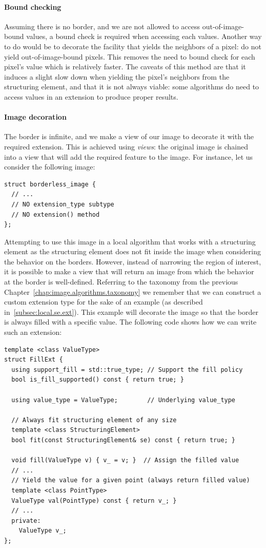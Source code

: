 \paragraph{Bound checking}
Assuming there is no border, and we are not allowed to access out-of-image-bound values, a bound check is required when
accessing each values. Another way to do would be to decorate the facility that yields the neighbors of a pixel: do not
yield out-of-image-bound pixels. This removes the need to bound check for each pixel's value which is relatively
faster. The caveats of this method are that it induces a slight slow down when yielding the pixel's neighbors from the
structuring element, and that it is not always viable: some algorithms do need to access values in an extension to
produce proper results.

\paragraph{Image decoration}
The border is infinite, and we make a view of our image to decorate it with the required extension. This is achieved
using \emph{views}: the original image is chained into a view that will add the required feature to the image. For
instance, let us consider the following image:
\begin{verbatim}
struct borderless_image {
  // ...
  // NO extension_type subtype
  // NO extension() method
};
\end{verbatim}

Attempting to use this image in a local algorithm that works with a structuring element as the structuring element does
not fit inside the image when considering the behavior on the borders. However, instead of narrowing the region of
interest, it is possible to make a view that will return an image from which the behavior at the border is well-defined.
Referring to the taxonomy from the previous Chapter~\ref{chap:image.algorithms.taxonomy} we remember that we can
construct a custom extension type for the sake of an example (as described in~\cref{subsec:local.se.ext}). This example
will decorate the image so that the border is always filled with a specific value. The following code shows how we can
write such an extension:
\begin{verbatim}
template <class ValueType>
struct FillExt {
  using support_fill = std::true_type; // Support the fill policy
  bool is_fill_supported() const { return true; }

  using value_type = ValueType;        // Underlying value_type

  // Always fit structuring element of any size
  template <class StructuringElement>
  bool fit(const StructuringElement& se) const { return true; }

  void fill(ValueType v) { v_ = v; }  // Assign the filled value
  // ...
  // Yield the value for a given point (always return filled value)
  template <class PointType>
  ValueType val(PointType) const { return v_; }
  // ...
  private:
    ValueType v_;
};
\end{verbatim}

